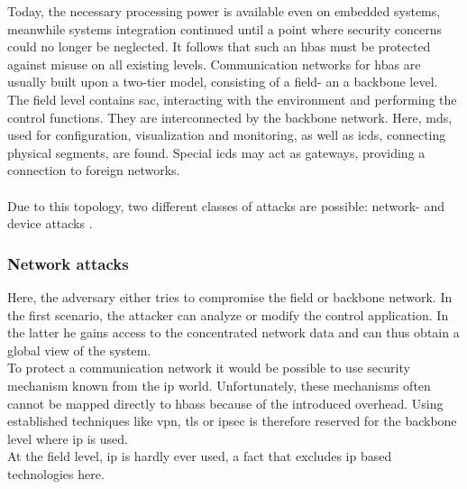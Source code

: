 Today, the necessary processing power is available even on embedded systems, meanwhile systems integration continued until a point where security concerns could
no longer be neglected. It follows that such an \gls{hbas} must be protected against misuse on all existing levels. 
Communication networks for \gls{hbas} are usually built upon a two-tier model, consisting of a field- an a backbone level. The field level contains \gls{sac},
interacting with the environment and performing the control functions. They are interconnected by the backbone network. Here, \glspl{md}, used for configuration,
visualization and monitoring, as well as \glspl{icd}, connecting physical segments, are found. Special \glspl{icd} may act as gateways, providing a connection to foreign networks. 
\\
\\
Due to this topology, two different classes of attacks are possible: network- and device attacks \cite{5332331}.

\subsubsection{Network attacks}
Here, the adversary either tries to compromise the field or backbone network. In the first scenario, the attacker can analyze or modify the control application. In the latter he
gains access to the concentrated network data and can thus obtain a global view of the system.
\\
To protect a communication network it would be possible to use security mechanism known from the \gls{ip} world. 
Unfortunately, these mechanisms often cannot be mapped directly to \glspl{hbas} because of the introduced overhead. Using
established techniques like \gls{vpn}, \gls{tls} or \gls{ipsec} is therefore reserved for the backbone level where \gls{ip} is used.
\\
At the field level, \gls{ip} is hardly ever used, a fact that excludes \gls{ip} based technologies here.

